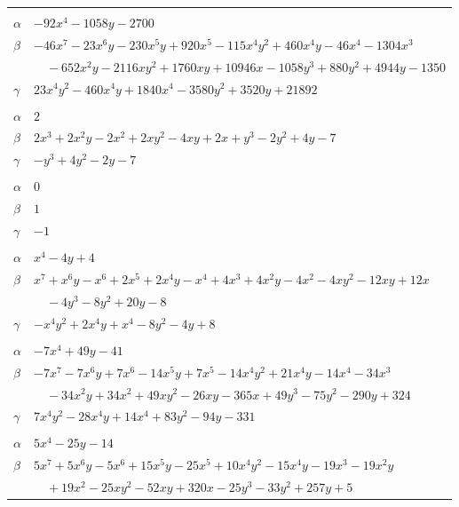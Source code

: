 \documentclass[11pt]{article}
\begin{document}
\begin{longtable}{@{}ll@{}}
\addlinespace[3pt]
\multicolumn{2}{@{}l}{$\{i,j\}=\{6,22\}$, $k_{ij}=2^{2}\cdot 3^{3}\cdot 5^{2}$}\\
$\alpha$ & $-92x^{4}-1058y-2700$\\
$\beta$ & $-46x^{7}-23x^{6}y-230x^{5}y+920x^{5}-115x^{4}y^{2}+460x^{4}y-46x^{4}-1304x^{3}$\\
 & $\quad -652x^{2}y-2116xy^{2}+1760xy+10946x-1058y^{3}+880y^{2}+4944y-1350$\\
$\gamma$ & $23x^{4}y^{2}-460x^{4}y+1840x^{4}-3580y^{2}+3520y+21892$\\
\addlinespace[3pt]
\multicolumn{2}{@{}l}{$\{i,j\}=\{7,10\}$, $k_{ij}=2^{2}\cdot 3$}\\
$\alpha$ & $2$\\
$\beta$ & $2x^{3}+2x^{2}y-2x^{2}+2xy^{2}-4xy+2x+y^{3}-2y^{2}+4y-7$\\
$\gamma$ & $-y^{3}+4y^{2}-2y-7$\\
\addlinespace[3pt]
\multicolumn{2}{@{}l}{$\{i,j\}=\{7,14\}$, $k_{ij}=1$}\\
$\alpha$ & $0$\\
$\beta$ & $1$\\
$\gamma$ & $-1$\\
\addlinespace[3pt]
\multicolumn{2}{@{}l}{$\{i,j\}=\{7,21\}$, $k_{ij}=2^{2}$}\\
$\alpha$ & $x^{4}-4y+4$\\
$\beta$ & $x^{7}+x^{6}y-x^{6}+2x^{5}+2x^{4}y-x^{4}+4x^{3}+4x^{2}y-4x^{2}-4xy^{2}-12xy+12x$\\
 & $\quad -4y^{3}-8y^{2}+20y-8$\\
$\gamma$ & $-x^{4}y^{2}+2x^{4}y+x^{4}-8y^{2}-4y+8$\\
\addlinespace[3pt]
\multicolumn{2}{@{}l}{$\{i,j\}=\{7,24\}$, $k_{ij}=2^{4}\cdot 3$}\\
$\alpha$ & $-7x^{4}+49y-41$\\
$\beta$ & $-7x^{7}-7x^{6}y+7x^{6}-14x^{5}y+7x^{5}-14x^{4}y^{2}+21x^{4}y-14x^{4}-34x^{3}$\\
 & $\quad -34x^{2}y+34x^{2}+49xy^{2}-26xy-365x+49y^{3}-75y^{2}-290y+324$\\
$\gamma$ & $7x^{4}y^{2}-28x^{4}y+14x^{4}+83y^{2}-94y-331$\\
\addlinespace[3pt]
\multicolumn{2}{@{}l}{$\{i,j\}=\{7,25\}$, $k_{ij}=3^{2}$}\\
$\alpha$ & $5x^{4}-25y-14$\\
$\beta$ & $5x^{7}+5x^{6}y-5x^{6}+15x^{5}y-25x^{5}+10x^{4}y^{2}-15x^{4}y-19x^{3}-19x^{2}y$\\
 & $\quad +19x^{2}-25xy^{2}-52xy+320x-25y^{3}-33y^{2}+257y+5$\\

\end{longtable}
\end{document}
